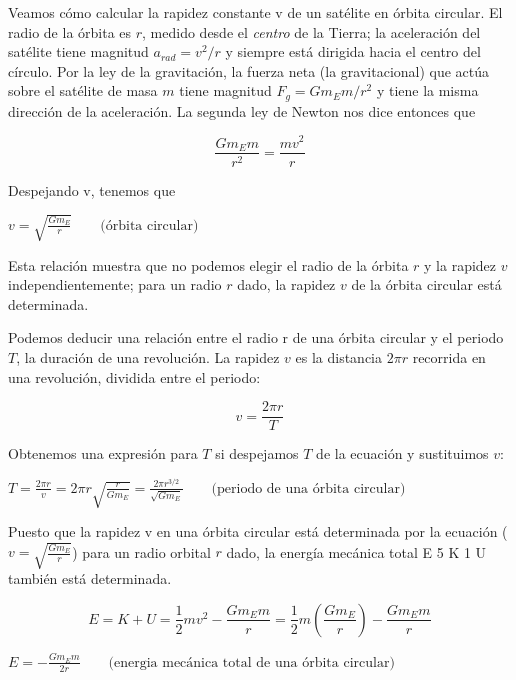 \documentclass{article}
\newcommand{\definicion}[1]{%
    \vspace{0.5cm}
    \begin{definicionbox}
        #1
    \end{definicionbox}
    \vspace{0.5cm}
}
\begin{document}
    \par Veamos cómo calcular la rapidez constante v de un satélite en órbita circular. El radio de la órbita es $r$, medido desde el \textit{centro} de la Tierra; la aceleración del satélite tiene magnitud $a_{rad} = v^2/r$ y siempre está dirigida hacia el centro del círculo. Por la ley de la gravitación, la fuerza neta (la gravitacional) que actúa sobre el satélite de masa $m$ tiene magnitud $F_g = G m_E m / r^2$ y tiene la misma dirección de la aceleración. La segunda ley de Newton nos dice entonces que

    \[ \frac{G m_E m}{r^2} = \frac{m v^2}{r} \]

    \noindent Despejando v, tenemos que

    \definicion{
        \centering
        \( v = \sqrt{\frac{G m_E}{r}} \quad \quad \text{(órbita circular)} \)
    }

    \par Esta relación muestra que no podemos elegir el radio de la órbita $r$ y la rapidez $v$ independientemente; para un radio $r$ dado, la rapidez $v$ de la órbita circular está determinada.

    \par Podemos deducir una relación entre el radio r de una órbita circular y el periodo $T$, la duración de una revolución. La rapidez $v$ es la distancia $2 \pi r$ recorrida en una revolución, dividida entre el periodo:

    \[ v = \frac{2 \pi r}{T} \]

    \par Obtenemos una expresión para $T$ si despejamos $T$ de la ecuación y sustituimos $v$:

    \definicion{
        \centering
        \( T = \frac{2 \pi r}{v} = 2 \pi r \sqrt{\frac{r}{G m_E}} = \frac{2 \pi r^{3/2}}{\sqrt{G m_E}} \quad \quad \text{(periodo de una órbita circular)} \)
    }

    \pagebreak

    \par Puesto que la rapidez v en una órbita circular está determinada por la ecuación ($v = \sqrt{\frac{G m_E}{r}}$) para un radio orbital $r$ dado, la energía mecánica total E 5 K 1 U también está determinada.

    \[ E = K + U = \frac{1}{2} m v^2 - \frac{G m_E m}{r} = \frac{1}{2} m \left( \frac{G m_E}{r} \right) - \frac{G m_E m}{r} \]

    \definicion{
        \centering
        \( E = - \frac{G m_E m}{2r} \quad \quad \text{(energia mecánica total de una órbita circular)} \)
    }
\end{document}
